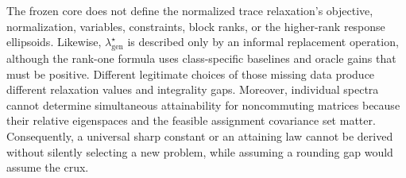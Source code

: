 The frozen core does not define the normalized trace relaxation's objective, normalization, variables, constraints, block ranks, or the higher-rank response ellipsoids.  Likewise, \(\lambda_{\mathrm{gen}}^\star\) is described only by an informal replacement operation, although the rank-one formula uses class-specific baselines and oracle gains that must be positive.  Different legitimate choices of those missing data produce different relaxation values and integrality gaps.  Moreover, individual spectra cannot determine simultaneous attainability for noncommuting matrices because their relative eigenspaces and the feasible assignment covariance set matter.  Consequently, a universal sharp constant or an attaining law cannot be derived without silently selecting a new problem, while assuming a rounding gap would assume the crux.